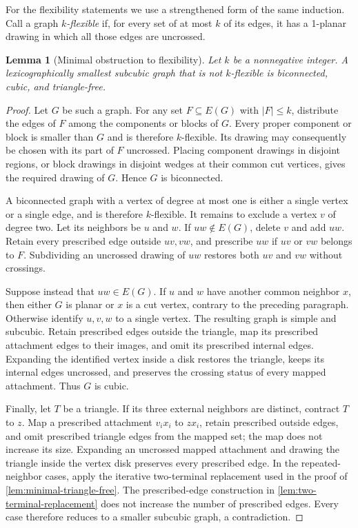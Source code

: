 \documentclass[a4paper,11pt]{article}
\theoremstyle{plain}
\newtheorem{lemma}{Lemma}
\theoremstyle{definition}  %
\begin{document}
For the flexibility statements we use a strengthened form of the same
induction.
Call a graph \emph{$k$-flexible} if, for every set of at most $k$ of its
edges, it has a 1-planar drawing in which all those edges are uncrossed.

\begin{lemma}[Minimal obstruction to flexibility]\label{lem:flexibility-core}
    Let $k$ be a nonnegative integer.  A lexicographically smallest subcubic graph that is not
    $k$-flexible is biconnected, cubic, and triangle-free.
\end{lemma}

\begin{proof}
    Let $G$ be such a graph.  For any set $F\subseteq E(G)$ with $|F|\leq k$,
    distribute the edges of $F$ among the components or blocks of $G$.  Every
    proper component or block is smaller than $G$ and is therefore
    $k$-flexible.  Its drawing may consequently be chosen with its part of
    $F$ uncrossed.  Placing component drawings in disjoint regions, or block
    drawings in disjoint wedges at their common cut vertices, gives the
    required drawing of $G$.  Hence $G$ is biconnected.

    A biconnected graph with a vertex of degree at most one is either a single
    vertex or a single edge, and is therefore $k$-flexible.  It remains to
    exclude a vertex $v$ of degree two.  Let its neighbors be
    $u$ and $w$.  If $uw\notin E(G)$, delete $v$ and add $uw$.  Retain every
    prescribed edge outside $uv,vw$, and prescribe $uw$ if $uv$ or $vw$
    belongs to $F$.  Subdividing an uncrossed drawing of $uw$ restores both
    $uv$ and $vw$ without crossings.

    Suppose instead that $uw\in E(G)$.  If $u$ and $w$ have another common
    neighbor $x$, then either $G$ is planar or $x$ is a cut vertex, contrary
    to the preceding paragraph.  Otherwise identify $u,v,w$ to a single
    vertex.  The resulting graph is simple and subcubic.  Retain prescribed
    edges outside the triangle, map its prescribed attachment edges to their
    images, and omit its prescribed internal edges.  Expanding the identified
    vertex inside a disk restores the triangle, keeps its internal edges
    uncrossed, and preserves the crossing status of every mapped attachment.
    Thus $G$ is cubic.

    Finally, let $T$ be a triangle.  If its three external neighbors are
    distinct, contract $T$ to $z$.  Map a prescribed attachment $v_ix_i$ to
    $zx_i$, retain prescribed outside edges, and omit prescribed triangle
    edges from the mapped set; the map does not increase its size.  Expanding
    an uncrossed mapped attachment and drawing the triangle inside the vertex
    disk preserves every prescribed edge.  In the repeated-neighbor cases,
    apply the iterative two-terminal replacement used in the proof of
    \cref{lem:minimal-triangle-free}.  The prescribed-edge construction in
    \cref{lem:two-terminal-replacement} does not increase the number of
    prescribed edges.  Every case therefore reduces to a smaller subcubic
    graph, a contradiction.
\end{proof}
\end{document}
